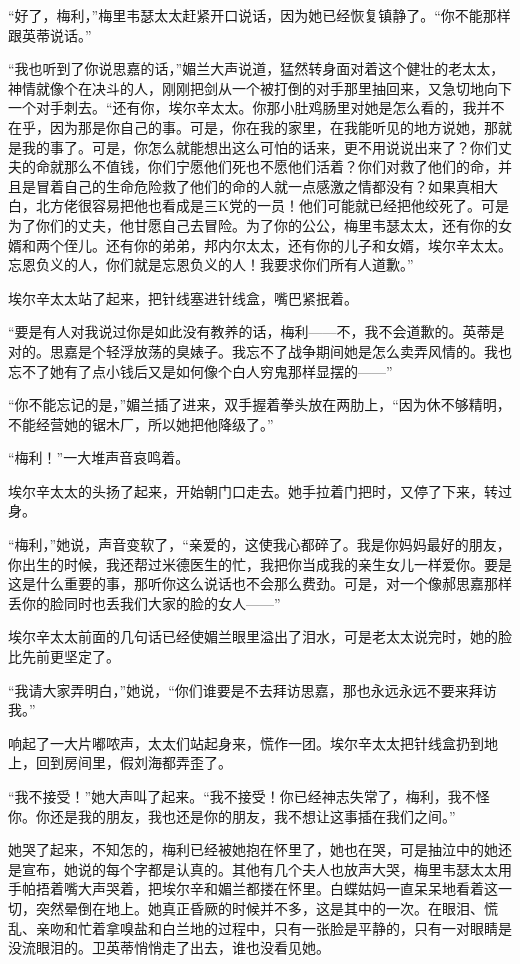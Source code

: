 \par “好了，梅利，”梅里韦瑟太太赶紧开口说话，因为她已经恢复镇静了。“你不能那样跟英蒂说话。”
\par “我也听到了你说思嘉的话，”媚兰大声说道，猛然转身面对着这个健壮的老太太，神情就像个在决斗的人，刚刚把剑从一个被打倒的对手那里抽回来，又急切地向下一个对手刺去。“还有你，埃尔辛太太。你那小肚鸡肠里对她是怎么看的，我并不在乎，因为那是你自己的事。可是，你在我的家里，在我能听见的地方说她，那就是我的事了。可是，你怎么就能想出这么可怕的话来，更不用说说出来了？你们丈夫的命就那么不值钱，你们宁愿他们死也不愿他们活着？你们对救了他们的命，并且是冒着自己的生命危险救了他们的命的人就一点感激之情都没有？如果真相大白，北方佬很容易把他也看成是三K党的一员！他们可能就已经把他绞死了。可是为了你们的丈夫，他甘愿自己去冒险。为了你的公公，梅里韦瑟太太，还有你的女婿和两个侄儿。还有你的弟弟，邦内尔太太，还有你的儿子和女婿，埃尔辛太太。忘恩负义的人，你们就是忘恩负义的人！我要求你们所有人道歉。”
\par 埃尔辛太太站了起来，把针线塞进针线盒，嘴巴紧抿着。
\par “要是有人对我说过你是如此没有教养的话，梅利——不，我不会道歉的。英蒂是对的。思嘉是个轻浮放荡的臭婊子。我忘不了战争期间她是怎么卖弄风情的。我也忘不了她有了点小钱后又是如何像个白人穷鬼那样显摆的——”
\par “你不能忘记的是，”媚兰插了进来，双手握着拳头放在两肋上，“因为休不够精明，不能经营她的锯木厂，所以她把他降级了。”
\par “梅利！”一大堆声音哀鸣着。
\par 埃尔辛太太的头扬了起来，开始朝门口走去。她手拉着门把时，又停了下来，转过身。
\par “梅利，”她说，声音变软了，“亲爱的，这使我心都碎了。我是你妈妈最好的朋友，你出生的时候，我还帮过米德医生的忙，我把你当成我的亲生女儿一样爱你。要是这是什么重要的事，那听你这么说话也不会那么费劲。可是，对一个像郝思嘉那样丢你的脸同时也丢我们大家的脸的女人——”
\par 埃尔辛太太前面的几句话已经使媚兰眼里溢出了泪水，可是老太太说完时，她的脸比先前更坚定了。
\par “我请大家弄明白，”她说，“你们谁要是不去拜访思嘉，那也永远永远不要来拜访我。”
\par 响起了一大片嘟哝声，太太们站起身来，慌作一团。埃尔辛太太把针线盒扔到地上，回到房间里，假刘海都弄歪了。
\par “我不接受！”她大声叫了起来。“我不接受！你已经神志失常了，梅利，我不怪你。你还是我的朋友，我也还是你的朋友，我不想让这事插在我们之间。”
\par 她哭了起来，不知怎的，梅利已经被她抱在怀里了，她也在哭，可是抽泣中的她还是宣布，她说的每个字都是认真的。其他有几个夫人也放声大哭，梅里韦瑟太太用手帕捂着嘴大声哭着，把埃尔辛和媚兰都搂在怀里。白蝶姑妈一直呆呆地看着这一切，突然晕倒在地上。她真正昏厥的时候并不多，这是其中的一次。在眼泪、慌乱、亲吻和忙着拿嗅盐和白兰地的过程中，只有一张脸是平静的，只有一对眼睛是没流眼泪的。卫英蒂悄悄走了出去，谁也没看见她。
